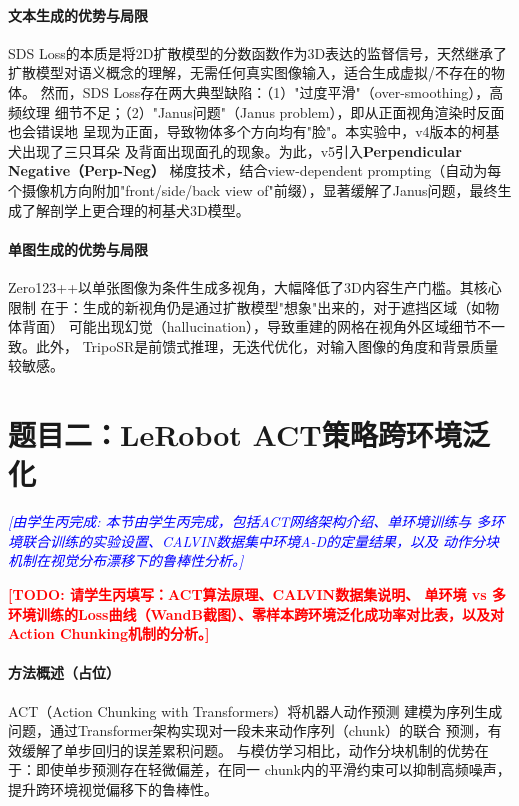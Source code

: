 \documentclass{article}
\newcommand{\placeholder}[1]{\textcolor{red}{\textbf{[TODO: #1]}}}
\newcommand{\tmate}[2]{\textcolor{blue}{\textit{[由#1完成: #2]}}}
\begin{document}
\paragraph{文本生成的优势与局限}
SDS Loss的本质是将2D扩散模型的分数函数作为3D表达的监督信号，天然继承了
扩散模型对语义概念的理解，无需任何真实图像输入，适合生成虚拟/不存在的物体。
然而，SDS Loss存在两大典型缺陷：（1）"过度平滑"（over-smoothing），高频纹理
细节不足；（2）"Janus问题"（Janus problem），即从正面视角渲染时反面也会错误地
呈现为正面，导致物体多个方向均有"脸"。本实验中，v4版本的柯基犬出现了三只耳朵
及背面出现面孔的现象。为此，v5引入\textbf{Perpendicular Negative（Perp-Neg）}
梯度技术，结合view-dependent prompting（自动为每个摄像机方向附加"front/side/back
view of"前缀），显著缓解了Janus问题，最终生成了解剖学上更合理的柯基犬3D模型。

\paragraph{单图生成的优势与局限}
Zero123++以单张图像为条件生成多视角，大幅降低了3D内容生产门槛。其核心限制
在于：生成的新视角仍是通过扩散模型"想象"出来的，对于遮挡区域（如物体背面）
可能出现幻觉（hallucination），导致重建的网格在视角外区域细节不一致。此外，
TripoSR是前馈式推理，无迭代优化，对输入图像的角度和背景质量较敏感。

\section{题目二：LeRobot ACT策略跨环境泛化}
\label{sec:task2}

\tmate{学生丙}{本节由学生丙完成，包括ACT网络架构介绍、单环境训练与
多环境联合训练的实验设置、CALVIN数据集中环境A-D的定量结果，以及
动作分块机制在视觉分布漂移下的鲁棒性分析。}

\placeholder{请学生丙填写：ACT算法原理、CALVIN数据集说明、
单环境 vs 多环境训练的Loss曲线（WandB截图）、零样本跨环境泛化成功率对比表，以及对Action Chunking机制的分析。}

\paragraph{方法概述（占位）}
ACT（Action Chunking with Transformers）\cite{zhao2023learning}将机器人动作预测
建模为序列生成问题，通过Transformer架构实现对一段未来动作序列（chunk）的联合
预测，有效缓解了单步回归的误差累积问题。
与模仿学习相比，动作分块机制的优势在于：即使单步预测存在轻微偏差，在同一
chunk内的平滑约束可以抑制高频噪声，提升跨环境视觉偏移下的鲁棒性。
\end{document}
